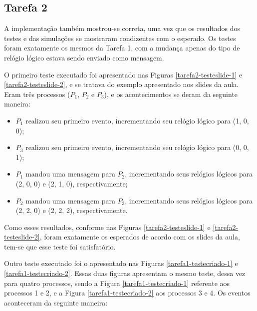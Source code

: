 \documentclass[conference]{IEEEtran}
\begin{document}
\subsection{Tarefa 2}

	A implementação também mostrou-se correta, uma vez que os resultados dos testes e das simulações se mostraram condizentes com o esperado. Os testes foram exatamente os mesmos da Tarefa 1, com a mudança apenas do tipo de relógio lógico estava sendo enviado como mensagem.
	
	O primeiro teste executado foi apresentado nas Figuras \ref{tarefa2-testeslide-1} e \ref{tarefa2-testeslide-2}, e se tratava do exemplo apresentado nos slides da aula. Eram três processos ($P_1$, $P_2$ e $P_3$), e os acontecimentos se deram da seguinte maneira:
	
\begin{itemize}
\item $P_1$ realizou seu primeiro evento, incrementando seu relógio lógico para (1, 0, 0);
\item $P_3$ realizou seu primeiro evento, incrementando seu relógio lógico para (0, 0, 1);
\item $P_1$ mandou uma mensagem para $P_2$, incrementando seus relógios lógicos para (2, 0, 0) e (2, 1, 0), respectivamente;
\item $P_2$ mandou uma mensagem para $P_3$, incrementando seus relógios lógicos para (2, 2, 0) e (2, 2, 2), respectivamente.
\end{itemize}

	Como esses resultados, conforme nas Figuras \ref{tarefa2-testeslide-1} e \ref{tarefa2-testeslide-2}, foram exatamente os esperados de acordo com os slides da aula, tem-se que esse teste foi satisfatório.



	Outro teste executado foi o apresentado nas Figuras \ref{tarefa1-testecriado-1} e \ref{tarefa1-testecriado-2}. Essas duas figuras apresentam o mesmo teste, dessa vez para quatro processos, sendo a Figura \ref{tarefa1-testecriado-1} referente aos processos 1 e 2, e a Figura \ref{tarefa1-testecriado-2} aos processos 3 e 4. Os eventos aconteceram da seguinte maneira:
	
\end{document}

